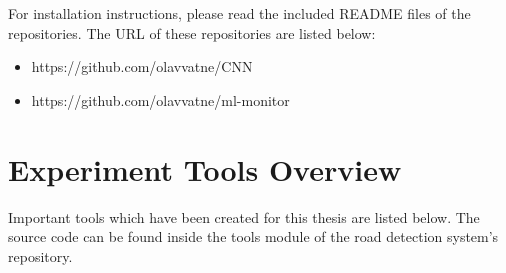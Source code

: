 For installation instructions, please read the included README files of the repositories. The URL of these repositories are listed below:

\begin{itemize}
\item https://github.com/olavvatne/CNN
\item https://github.com/olavvatne/ml-monitor
\end{itemize} 

\section{Experiment Tools Overview}
\label{app:tools}
Important tools which have been created for this thesis are listed below. The source code can be found inside the tools module of the road detection system's repository.

